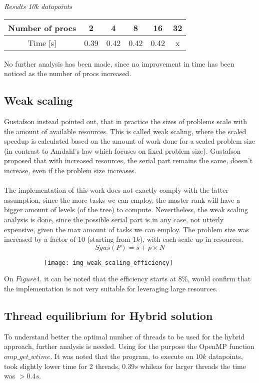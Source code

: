 \documentclass[11pt]{article}
\newcommand{\plotheight}{0.425}
\newcommand{\plotwidth}{0.7}
\begin{document}
\textit{Results 10k datapoints}
\begin{center}
\begin{tabular}{ |c|c|c|c|c|c| } 
 \hline
 Number of procs & 2 & 4 & 8 & 16 & 32 \\
 \hline
 Time [s] & 0.39 &	0.42 & 0.42	& 0.42 & x \\
 \hline
\end{tabular}
\end{center}

No further analysis has been made, since no improvement in time has been noticed as the number of procs increased.
\subsection{Weak scaling}
Gustafson instead pointed out, that in practice the sizes of problems scale with the amount of available resources.
This is called weak scaling, where the scaled speedup is calculated based on the amount of work done for a scaled problem size (in contrast to Amdahl’s law which focuses on fixed problem size). Gustafson proposed that with increased resources, the serial part remains the same, doesn't increase, even if the problem size increases.\\\\The implementation of this work does not exactly comply with the latter assumption, since the more tasks we can employ, the master rank will have a bigger amount of levels (of the tree) to compute. Nevertheless, the weak scaling analysis is done, since the possible serial part is in any case, not utterly expensive, given the max amount of tasks we can employ. The problem size was increased by a factor of $10$ (starting from $1k$), with each scale up in resources.
\begin{equation} \label{eqn}
	Sgus(P) = {s + p × N} 
\end{equation}
\begin{figure}[H]
\centering
\begin{subfigure}{\plotwidth\textwidth}
\centering
\texttt{[image: img\_weak\_scaling\_efficiency]}
\end{subfigure}
\end{figure}
On $Figure 4.$ it can be noted that the efficiency starts at $8\%$, would confirm that the implementation is not very suitable for leveraging large resources.
\subsection{Thread equilibrium for Hybrid solution}
To understand better the optimal number of threads to be used for the hybrid approach, further analysis is needed.
Using for the purpose the OpenMP function $omp\_get\_wtime$.
It was noted that the program, to execute on $10k$ datapoints, took slightly lower time for 2 threads, $0.39s$ whileas for larger threads the time was $>0.4s$.
\end{document}
